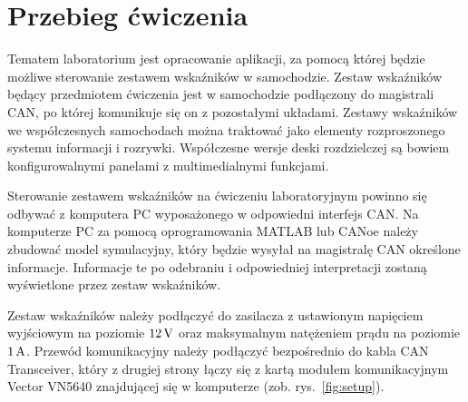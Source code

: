 \documentclass[11pt,onecolumn]{article}
\begin{document}
\section{Przebieg ćwiczenia} \label{sec:przebieg}
%
Tematem laboratorium jest opracowanie aplikacji, za pomocą której będzie możliwe sterowanie zestawem wskaźników w samochodzie. Zestaw wskaźników będący przedmiotem ćwiczenia jest w samochodzie podłączony do magistrali CAN, po której komunikuje się on z pozostałymi układami. Zestawy wskaźników we współczesnych samochodach można traktować jako elementy rozproszonego systemu informacji i rozrywki. Współczesne wersje deski rozdzielczej są bowiem konfigurowalnymi panelami z multimedialnymi funkcjami. 

Sterowanie zestawem wskaźników na ćwiczeniu laboratoryjnym powinno się odbywać z komputera PC wyposażonego w odpowiedni interfejs CAN. Na komputerze PC za pomocą oprogramowania MATLAB lub CANoe należy zbudować model symulacyjny, który będzie wysyłał na magistralę CAN określone informacje. Informacje te po odebraniu i odpowiedniej interpretacji zostaną wyświetlone przez zestaw wskaźników. 

Zestaw wskaźników należy podłączyć do zasilacza z ustawionym napięciem wyjściowym na poziomie $12\,{\rm V}$ oraz maksymalnym natężeniem prądu na poziomie $1\, \rm{A}$. Przewód komunikacyjny należy podłączyć bezpośrednio do kabla CAN Transceiver, który z drugiej strony łączy się z kartą modułem komunikacyjnym Vector VN5640 znajdującej się w komputerze (zob. rys.~\ref{fig:setup}).
\end{document}
